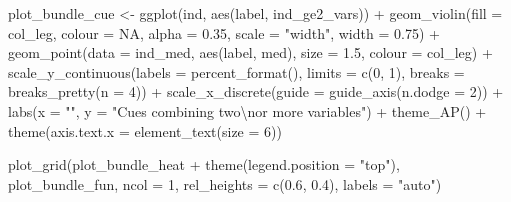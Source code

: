 \documentclass[
  11pt,
]{article}
\newenvironment{Shaded}{\begin{snugshade}}{\end{snugshade}}
\newcommand{\AttributeTok}[1]{\textcolor[rgb]{0.77,0.63,0.00}{#1}}
\newcommand{\ConstantTok}[1]{\textcolor[rgb]{0.00,0.00,0.00}{#1}}
\newcommand{\DecValTok}[1]{\textcolor[rgb]{0.00,0.00,0.81}{#1}}
\newcommand{\FloatTok}[1]{\textcolor[rgb]{0.00,0.00,0.81}{#1}}
\newcommand{\FunctionTok}[1]{\textcolor[rgb]{0.00,0.00,0.00}{#1}}
\newcommand{\NormalTok}[1]{#1}
\newcommand{\OtherTok}[1]{\textcolor[rgb]{0.56,0.35,0.01}{#1}}
\newcommand{\SpecialCharTok}[1]{\textcolor[rgb]{0.00,0.00,0.00}{#1}}
\newcommand{\StringTok}[1]{\textcolor[rgb]{0.31,0.60,0.02}{#1}}
\begin{document}
\begin{Shaded}
\begin{Highlighting}[]
\NormalTok{plot\_bundle\_cue }\OtherTok{\textless{}{-}} \FunctionTok{ggplot}\NormalTok{(ind, }\FunctionTok{aes}\NormalTok{(label, ind\_ge2\_vars)) }\SpecialCharTok{+}
  \FunctionTok{geom\_violin}\NormalTok{(}\AttributeTok{fill =}\NormalTok{ col\_leg, }\AttributeTok{colour =} \ConstantTok{NA}\NormalTok{, }\AttributeTok{alpha =} \FloatTok{0.35}\NormalTok{, }\AttributeTok{scale =} \StringTok{"width"}\NormalTok{,}
              \AttributeTok{width =} \FloatTok{0.75}\NormalTok{) }\SpecialCharTok{+}
  \FunctionTok{geom\_point}\NormalTok{(}\AttributeTok{data =}\NormalTok{ ind\_med, }\FunctionTok{aes}\NormalTok{(label, med), }\AttributeTok{size =} \FloatTok{1.5}\NormalTok{, }\AttributeTok{colour =}\NormalTok{ col\_leg) }\SpecialCharTok{+}
  \FunctionTok{scale\_y\_continuous}\NormalTok{(}\AttributeTok{labels =} \FunctionTok{percent\_format}\NormalTok{(), }\AttributeTok{limits =} \FunctionTok{c}\NormalTok{(}\DecValTok{0}\NormalTok{, }\DecValTok{1}\NormalTok{),}
                     \AttributeTok{breaks =} \FunctionTok{breaks\_pretty}\NormalTok{(}\AttributeTok{n =} \DecValTok{4}\NormalTok{)) }\SpecialCharTok{+}
  \FunctionTok{scale\_x\_discrete}\NormalTok{(}\AttributeTok{guide =} \FunctionTok{guide\_axis}\NormalTok{(}\AttributeTok{n.dodge =} \DecValTok{2}\NormalTok{)) }\SpecialCharTok{+}
  \FunctionTok{labs}\NormalTok{(}\AttributeTok{x =} \StringTok{""}\NormalTok{, }\AttributeTok{y =} \StringTok{"Cues combining two}\SpecialCharTok{\textbackslash{}n}\StringTok{or more variables"}\NormalTok{) }\SpecialCharTok{+}
  \FunctionTok{theme\_AP}\NormalTok{() }\SpecialCharTok{+}
  \FunctionTok{theme}\NormalTok{(}\AttributeTok{axis.text.x =} \FunctionTok{element\_text}\NormalTok{(}\AttributeTok{size =} \DecValTok{6}\NormalTok{))}
\end{Highlighting}
\end{Shaded}

\begin{Shaded}
\begin{Highlighting}[]
\FunctionTok{plot\_grid}\NormalTok{(plot\_bundle\_heat }\SpecialCharTok{+} 
            \FunctionTok{theme}\NormalTok{(}\AttributeTok{legend.position =} \StringTok{"top"}\NormalTok{), }
\NormalTok{          plot\_bundle\_fun, }\AttributeTok{ncol =} \DecValTok{1}\NormalTok{, }
          \AttributeTok{rel\_heights =} \FunctionTok{c}\NormalTok{(}\FloatTok{0.6}\NormalTok{, }\FloatTok{0.4}\NormalTok{), }\AttributeTok{labels =} \StringTok{"auto"}\NormalTok{)}
\end{Highlighting}
\end{Shaded}
\end{document}
